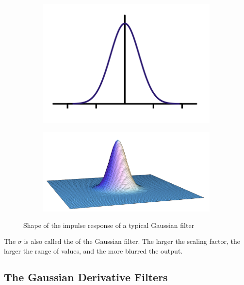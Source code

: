 \begin{figure}[ht!]
    \centering

    \begin{subfigure}[t]{0.45\linewidth}
        \centering
        \includegraphics[width=0.75\linewidth]{figures/700px-Gaussian_Filter.svg.png}
    \end{subfigure}
    \begin{subfigure}[t]{0.45\linewidth}
        \centering
        \includegraphics[width=\linewidth]{figures/2d-gaussian.png}
    \end{subfigure}

    \caption{Shape of the impulse response of a typical Gaussian filter}
\end{figure}

The $\sigma$ is also called the  of the Gaussian filter. The larger the scaling factor, the larger the range of values, and the more blurred the output.

\subsection{The Gaussian Derivative Filters}

